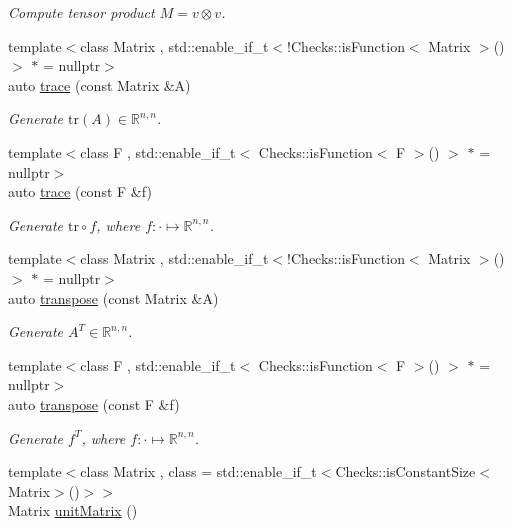 \begin{DoxyCompactItemize}
\begin{DoxyCompactList}\small\item\em Compute tensor product $ M = v \otimes v $. \end{DoxyCompactList}\item 
{\footnotesize template$<$class Matrix , std\-::enable\-\_\-if\-\_\-t$<$!\-Checks\-::is\-Function$<$ Matrix $>$()$>$ $\ast$  = nullptr$>$ }\\auto \hyperlink{group__LinearAlgebraGroup_ga4d73eb4d46dd9196a31e2d6d557d509e}{trace} (const Matrix \&A)
\begin{DoxyCompactList}\small\item\em Generate $\mathrm{tr}(A)\in\mathbb{R}^{n,n}$. \end{DoxyCompactList}\item 
{\footnotesize template$<$class F , std\-::enable\-\_\-if\-\_\-t$<$ Checks\-::is\-Function$<$ F $>$() $>$ $\ast$  = nullptr$>$ }\\auto \hyperlink{group__LinearAlgebraGroup_ga950717870525c43be79245413717673c}{trace} (const F \&f)
\begin{DoxyCompactList}\small\item\em Generate $\mathrm{tr}\circ f$, where $f:\cdot\mapsto\mathbb{R}^{n,n} $. \end{DoxyCompactList}\item 
{\footnotesize template$<$class Matrix , std\-::enable\-\_\-if\-\_\-t$<$!\-Checks\-::is\-Function$<$ Matrix $>$()$>$ $\ast$  = nullptr$>$ }\\auto \hyperlink{group__LinearAlgebraGroup_ga6110875ecb3c2559f8f4b42a3627a65b}{transpose} (const Matrix \&A)
\begin{DoxyCompactList}\small\item\em Generate $A^T\in\mathbb{R}^{n,n}$. \end{DoxyCompactList}\item 
{\footnotesize template$<$class F , std\-::enable\-\_\-if\-\_\-t$<$ Checks\-::is\-Function$<$ F $>$() $>$ $\ast$  = nullptr$>$ }\\auto \hyperlink{group__LinearAlgebraGroup_ga410ef1b161789c0c9f01ae5f5caf058f}{transpose} (const F \&f)
\begin{DoxyCompactList}\small\item\em Generate $f^T$, where $f:\cdot\mapsto\mathbb{R}^{n,n} $. \end{DoxyCompactList}\item 
{\footnotesize template$<$class Matrix , class  = std\-::enable\-\_\-if\-\_\-t$<$\-Checks\-::is\-Constant\-Size$<$\-Matrix$>$()$>$$>$ }\\Matrix \hyperlink{group__LinearAlgebraGroup_ga88a596b8526c0ed98ce241244fb85948}{unit\-Matrix} ()

\end{DoxyCompactItemize}
